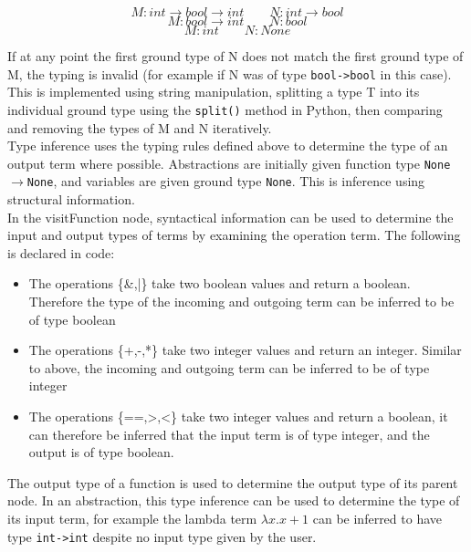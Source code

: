 \documentclass[a4paper,11pt]{report}
\begin{document}
\begin{equation*}
M:int\rightarrow bool\rightarrow int \qquad N:int\rightarrow bool
\end{equation*}
\begin{equation*}
M:bool\rightarrow int \qquad N:bool
\end{equation*}
\begin{equation*}
M:int \qquad N:None
\end{equation*}

If at any point the first ground type of N does not match the first ground type of M, the typing is invalid (for example if N was of type \texttt{bool->bool} in this case). This is implemented using string manipulation, splitting a type T into its individual ground type using the \texttt{split()} method in Python, then comparing and removing the types of M and N iteratively.\\

Type inference uses the typing rules defined above to determine the type of an output term where possible. Abstractions are initially given function type \texttt{None$\rightarrow$None}, and variables are given ground type \texttt{None}. This is inference using structural information.\\

In the visitFunction node, syntactical information can be used to determine the input and output types of terms by examining the operation term. The following is declared in code:

\begin{itemize}
	\item The operations \{\&,|\} take two boolean values and return a boolean. Therefore the type of the incoming and outgoing term can be inferred to be of type boolean
	\item The operations \{+,-,*\} take two integer values and return an integer. Similar to above, the incoming and outgoing term can be inferred to be of type integer
	\item The operations \{==,>,<\} take two integer values and return a boolean, it can therefore be inferred that the input term is of type integer, and the output is of type boolean. 
\end{itemize}

The output type of a function is used to determine the output type of its parent node. In an abstraction, this type inference can be used to determine the type of its input term, for example the lambda term $\lambda x.x+1$ can be inferred to have type \texttt{int->int} despite no input type given by the user.\\
\end{document}
